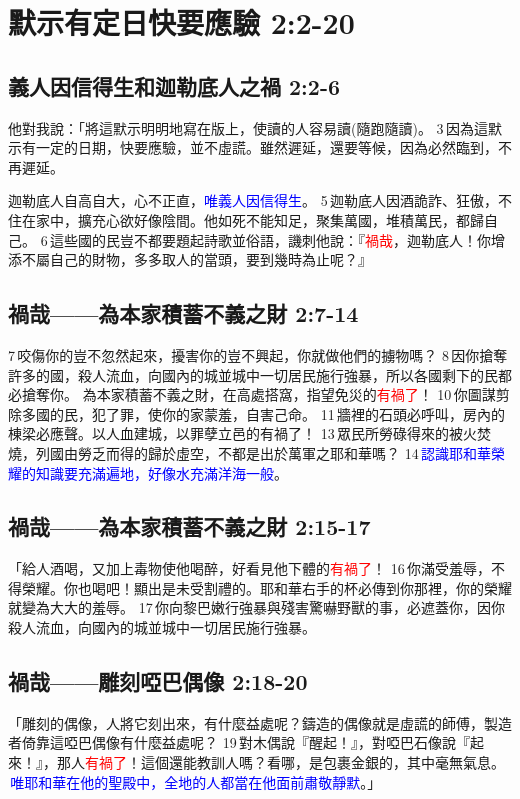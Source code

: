\section{默示有定日快要應驗 2:2-20}
\subsection{義人因信得生和迦勒底人之禍 2:2-6}
他對我說：「將這默示明明地寫在版上，使讀的人容易讀(隨跑隨讀)。 3 因為這默示有一定的日期，快要應驗，並不虛謊。雖然遲延，還要等候，因為必然臨到，不再遲延。

迦勒底人自高自大，心不正直，\textcolor{blue}{唯義人因信得生}。 5 迦勒底人因酒詭詐、狂傲，不住在家中，擴充心欲好像陰間。他如死不能知足，聚集萬國，堆積萬民，都歸自己。 6 這些國的民豈不都要題起詩歌並俗語，譏刺他說：『\textcolor{red}{禍哉}，迦勒底人！你增添不屬自己的財物，多多取人的當頭，要到幾時為止呢？』 

\subsection{禍哉——為本家積蓄不義之財 2:7-14}
7 咬傷你的豈不忽然起來，擾害你的豈不興起，你就做他們的擄物嗎？ 8 因你搶奪許多的國，殺人流血，向國內的城並城中一切居民施行強暴，所以各國剩下的民都必搶奪你。
為本家積蓄不義之財，在高處搭窩，指望免災的\textcolor{red}{有禍了}！ 10 你圖謀剪除多國的民，犯了罪，使你的家蒙羞，自害己命。 11 牆裡的石頭必呼叫，房內的棟梁必應聲。以人血建城，以罪孽立邑的有禍了！ 13 眾民所勞碌得來的被火焚燒，列國由勞乏而得的歸於虛空，不都是出於萬軍之耶和華嗎？ 14 \textcolor{blue}{認識耶和華榮耀的知識要充滿遍地，好像水充滿洋海一般}。

\subsection{禍哉——為本家積蓄不義之財 2:15-17}
「給人酒喝，又加上毒物使他喝醉，好看見他下體的\textcolor{red}{有禍了}！ 16 你滿受羞辱，不得榮耀。你也喝吧！顯出是未受割禮的。耶和華右手的杯必傳到你那裡，你的榮耀就變為大大的羞辱。 17 你向黎巴嫩行強暴與殘害驚嚇野獸的事，必遮蓋你，因你殺人流血，向國內的城並城中一切居民施行強暴。

\subsection{禍哉——雕刻啞巴偶像 2:18-20}
「雕刻的偶像，人將它刻出來，有什麼益處呢？鑄造的偶像就是虛謊的師傅，製造者倚靠這啞巴偶像有什麼益處呢？ 19 對木偶說『醒起！』，對啞巴石像說『起來！』，那人\textcolor{red}{有禍了}！這個還能教訓人嗎？看哪，是包裹金銀的，其中毫無氣息。  \textcolor{blue}{唯耶和華在他的聖殿中，全地的人都當在他面前肅敬靜默}。」

